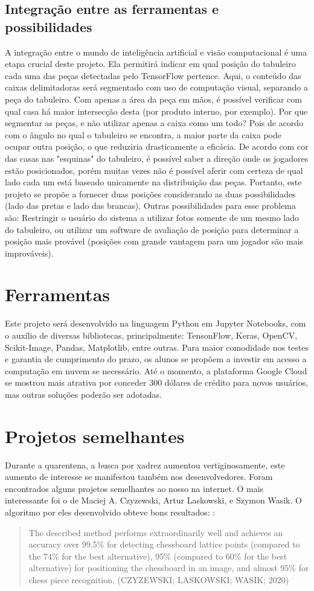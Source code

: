 \documentclass[a4paper,12pt,twoside]{article}
\begin{document}
\subsection{Integração entre as ferramentas e possibilidades}

A integração entre o mundo de inteligência artificial e visão computacional é uma etapa crucial deste projeto.
Ela permitirá indicar em qual posição do tabuleiro cada uma das peças detectadas pelo TensorFlow pertence.
Aqui, o conteúdo das caixas delimitadoras será segmentado com uso de computação visual, separando a peça do tabuleiro.
Com apenas a área da peça em mãos,
é possível verificar com qual casa há maior intersecção desta (por produto interno, por exemplo).
Por que segmentar as peças, e não utilizar apenas a caixa como um todo?
Pois de acordo com o ângulo no qual o tabuleiro se encontra,
a maior parte da caixa pode ocupar outra posição, o que reduziria drasticamente a eficácia.
De acordo com cor das casas nas "esquinas" do tabuleiro,
é possível saber a direção onde os jogadores estão posicionados,
porém muitas vezes não é possível aferir com certeza de qual lado cada um está baseado unicamente na distribuição das peças.
Portanto, este projeto se propõe a fornecer duas posições considerando as duas possibilidades
(lado das pretas e lado das brancas).
Outras possibilidades para esse problema são:
Restringir o usuário do sistema a utilizar fotos somente de um mesmo lado do tabuleiro,
ou utilizar um software de avaliação de posição para determinar a posição mais provável
(posições com grande vantagem para um jogador são mais improváveis).

\section{Ferramentas}
Este projeto será desenvolvido na linguagem Python em Jupyter Notebooks,
com o auxílio de diversas bibliotecas, principalmente:
TensonFlow, Keras, OpenCV, Scikit-Image, Pandas, Matplotlib, entre outras.
Para maior comodidade nos testes e garantia de cumprimento do prazo,
os alunos se propõem a investir em acesso a computação em nuvem se necessário.
Até o momento, a plataforma Google Cloud se mostrou mais atrativa por conceder 300 dólares de crédito para novos usuários,
mas outras soluções poderão ser adotadas.

\section{Projetos semelhantes}
Durante a quarentena, a busca por xadrez aumentou vertiginosamente,
este aumento de interesse se manifestou também nos desenvolvedores.
Foram encontrados alguns projetos semelhantes ao nosso na internet.
O mais interessante foi o de Maciej A. Czyzewski, Artur Laskowski, e Szymon Wasik.
O algoritmo por eles desenvolvido obteve bons resultados:
\cite{czy20}:
\blockquote{The described method performs extraordinarily well and achieves an accuracy over
            99.5\% for detecting chessboard lattice points (compared to the 74\% for the best alternative),
            95\% (compared to 60\% for the best alternative) for positioning the chessboard in an image, and almost
            95\% for chess piece recognition. (CZYZEWSKI; LASKOWSKI; WASIK; 2020)}
\end{document}
